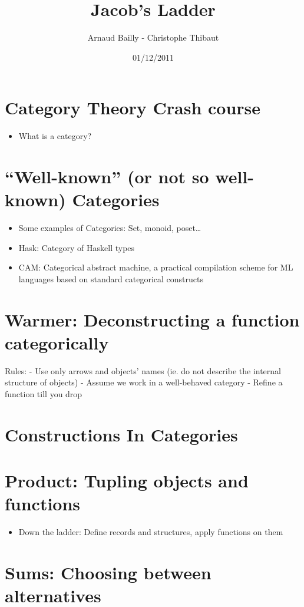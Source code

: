 \documentclass{article}
\title{Jacob's Ladder}
\author{Arnaud Bailly - Christophe Thibaut}
\date{01/12/2011}
\begin{document}
\maketitle

\section{Category Theory Crash course}

\begin{itemize}
\item
  What is a category?
\end{itemize}
\section{``Well-known'' (or not so well-known) Categories}

\begin{itemize}
\item
  Some examples of Categories: Set, monoid, poset\ldots{}
\item
  Hask: Category of Haskell types
\item
  CAM: Categorical abstract machine, a practical compilation scheme for
  ML languages based on standard categorical constructs
\end{itemize}
\section{Warmer: Deconstructing a function categorically}

Rules: - Use only arrows and objects' names (ie. do not describe the
internal structure of objects) - Assume we work in a well-behaved
category - Refine a function till you drop

\section{Constructions In Categories}

\section{Product: Tupling objects and functions}

\begin{itemize}
\item
  Down the ladder: Define records and structures, apply functions on
  them
\end{itemize}
\section{Sums: Choosing between alternatives}
\end{document}
